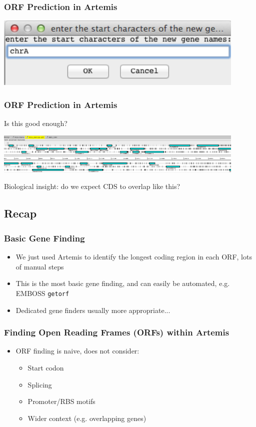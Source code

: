 \documentclass[table]{beamer}
\begin{document}
    \begin{frame}
      \frametitle{ORF Prediction in Artemis}    
      \begin{center}
        \includegraphics[width=0.9\textwidth]{images/artemis_orf13}     
      \end{center}
    \end{frame}

    \begin{frame}
      \frametitle{ORF Prediction in Artemis}   
      Is this good enough? 
      \begin{center}
        \includegraphics[width=0.9\textwidth]{images/artemis_orf14}     
      \end{center}
      Biological insight: do we expect CDS to overlap like this?
    \end{frame}

\subsection{Recap}
\begin{frame}
    \frametitle{Basic Gene Finding}
    \begin{itemize}
      \item We just used Artemis to identify the longest coding region in each ORF, lots of manual steps
      \item This is the most basic gene finding, and can easily be automated, e.g. EMBOSS \texttt{getorf}
      \item Dedicated gene finders usually more appropriate...
    \end{itemize}
\end{frame}

\begin{frame}
    \frametitle{Finding Open Reading Frames (ORFs) within Artemis}
    \begin{itemize}
      \item<1-> ORF finding is naive, does not consider:
      \begin{itemize}
        \item Start codon
        \item Splicing
        \item Promoter/RBS motifs
        \item Wider context (e.g. overlapping genes)
      \end{itemize}
    \end{itemize}
\end{frame}
\end{document}
